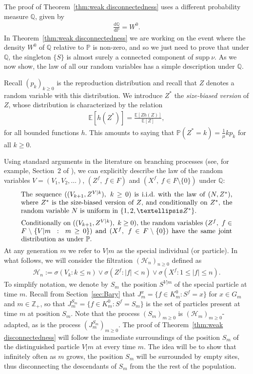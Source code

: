 \documentclass[12pt]{article}
\numberwithin{theorem}{section}
\theoremstyle{def}
\numberwithin{equation}{section}
\renewcommand{\P}{\mathbb{P}}
\newcommand{\E}{\mathbb{E}}
\newcommand{\Z}{\mathbb{Z}}
\newcommand{\Q}{\mathbb{Q}}
\newcommand{\cH}{\mathcal H}
\newcommand{\supp}{\mathrm{supp}}
\begin{document}
The proof of Theorem~\ref{thm:weak disconnectedness} uses a different probability measure $\Q$, given by 
\begin{align*}
	\frac{\mathrm{d} \Q}{\mathrm{d}\P} = W^0.
\end{align*}
In Theorem~\ref{thm:weak disconnectedness} we are working on the event where the density $W^0$ of $\Q$ relative to $\P$ is non-zero, and so 
we just need to prove that under $\Q$, the singleton $\{S\}$ is almost surely a connected component of $\supp  \ \nu$. 
As we now show, the law of all our random variables has a simple description under $\Q$. 

Recall $(p_k)_{k\geq 0}$ is the reproduction distribution and recall that $Z$ denotes a random variable with this distribution. 
We introduce $Z^*$ the \emph{size-biased version} of $Z$, whose distribution is characterized by the relation
\begin{align*}
	\E\left[h(Z^*)\right] = \frac{\E \left[Z h(Z)\right]}{\E[Z]},
\end{align*} 
for all bounded functions $h$. This amounts to saying that $\P(Z^*=k)=\frac{1}{\mu} k p_k$ for all $k\geq 0$.


Using standard arguments in the literature on branching processes (see, for example, Section~2 of \cite{LPP95}),
we can explicitly describe the law of the random variables $V=(V_1,V_2,\dots)$, $(Z^f, \ f\in F)$ and $(X^f, \ f\in F\setminus\{0\})$ under $\Q$: 
\begin{equation}\label{qdist1}
	\parbox[t]{0.9\textwidth}{The sequence $((V_{k+1},Z^{V|k}), \ k\geq 0)$ is i.i.d.\  with the law of $(N,Z^*)$, where $Z^*$ is
		the size-biased version of $Z$, and conditionally on $Z^*$, the random variable $N$ is uniform in $\{1,2,\dots Z^*\}$.}
\end{equation}
\begin{equation}\label{qdist2}
		\parbox[t]{0.9\textwidth}{ Conditionally on $((V_{k+1},Z^{V|k}), \ k\geq 0)$, the random variables $(Z^f, \ f\in F\setminus \{V|m \ : \ m\geq 0\})$ and $(X^f, \ f\in F\setminus\{0\})$ have the same joint distribution as under $\P$.}
\end{equation}
At any generation $m$ we refer to $V|m$ as the special individual (or particle).
In what follows, we will consider the filtration $(\cH_n)_{n\geq 0}$ defined as
\begin{align*}
	\cH_n:= \sigma(V_k:k \leq n)\vee \sigma(Z^f:|f|<n) \vee  \sigma(X^f:1\le |f|\leq n).
\end{align*}
To simplify notation, we denote by $S_m$ the position $S^{V|m}$ of the special particle at time $m$. Recall from Section~\ref{sec:Bary} that $J_m^x=\{f\in K_m^0:S^f=x\}$ for $x\in G_m$ and $m\in\Z_+$, so that $J_m^{S_m}=\{f\in K^0_m:S^f=S_m\}$ is the set of particles present at time $m$ at position $S_m$. 
Note that the process $(S_m)_{m\geq 0}$ is $(\cH_m)_{m\geq 0}$-adapted, as is the process $(J_m^{S_m})_{m\geq 0}$.
The proof of Theorem~\ref{thm:weak disconnectedness} will follow the immediate surroundings of the position $S_m$ of the distinguished particle $V|m$ at every time $m$. The idea will be to show that infinitely often as $m$ grows, the position $S_m$ will be surrounded by empty sites, thus disconnecting the descendants of $S_m$ from the the rest of the population.
\end{document}
